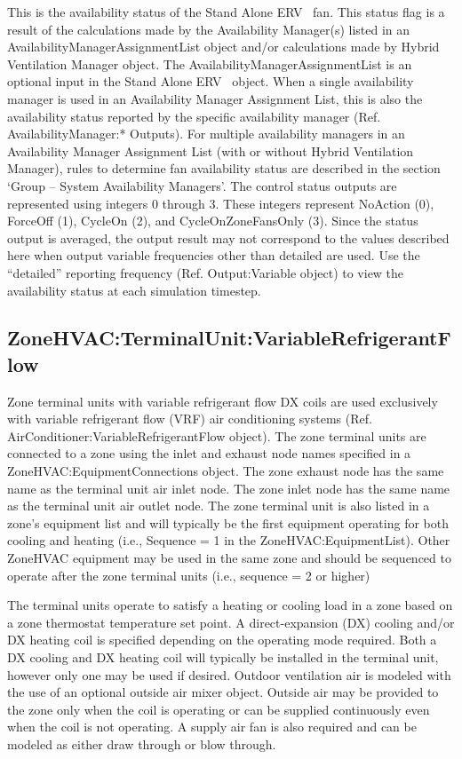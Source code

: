 This is the availability status of the Stand Alone ERV~ fan. This status flag is a result of the calculations made by the Availability Manager(s) listed in an AvailabilityManagerAssignmentList object and/or calculations made by Hybrid Ventilation Manager object. The AvailabilityManagerAssignmentList is an optional input in the Stand Alone ERV~ object. When a single availability manager is used in an Availability Manager Assignment List, this is also the availability status reported by the specific availability manager (Ref. AvailabilityManager:* Outputs). For multiple availability managers in an Availability Manager Assignment List (with or without Hybrid Ventilation Manager), rules to determine fan availability status are described in the section `Group -- System Availability Managers'. The control status outputs are represented using integers 0 through 3. These integers represent NoAction (0), ForceOff (1), CycleOn (2), and CycleOnZoneFansOnly (3). Since the status output is averaged, the output result may not correspond to the values described here when output variable frequencies other than detailed are used. Use the ``detailed'' reporting frequency (Ref. Output:Variable object) to view the availability status at each simulation timestep.

\subsection{ZoneHVAC:TerminalUnit:VariableRefrigerantFlow}\label{zonehvacterminalunitvariablerefrigerantflow}

Zone terminal units with variable refrigerant flow DX coils are used exclusively with variable refrigerant flow (VRF) air conditioning systems (Ref. AirConditioner:VariableRefrigerantFlow object). The zone terminal units are connected to a zone using the inlet and exhaust node names specified in a ZoneHVAC:EquipmentConnections object. The zone exhaust node has the same name as the terminal unit air inlet node. The zone inlet node has the same name as the terminal unit air outlet node. The zone terminal unit is also listed in a zone's equipment list and will typically be the first equipment operating for both cooling and heating (i.e., Sequence = 1 in the ZoneHVAC:EquipmentList). Other ZoneHVAC equipment may be used in the same zone and should be sequenced to operate after the zone terminal units (i.e., sequence = 2 or higher)

The terminal units operate to satisfy a heating or cooling load in a zone based on a zone thermostat temperature set point. A direct-expansion (DX) cooling and/or DX heating coil is specified depending on the operating mode required. Both a DX cooling and DX heating coil will typically be installed in the terminal unit, however only one may be used if desired. Outdoor ventilation air is modeled with the use of an optional outside air mixer object. Outside air may be provided to the zone only when the coil is operating or can be supplied continuously even when the coil is not operating. A supply air fan is also required and can be modeled as either draw through or blow through.

